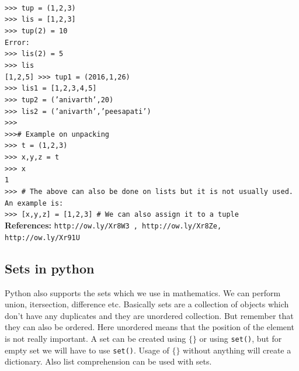 \documentclass[12pt,a4paper]{article}
\begin{document}
\texttt{\\
>>> tup = (1,2,3)\\
>>> lis = [1,2,3]\\
>>> tup(2) = 10\\
Error:\\
>>> lis(2) = 5\\
>>> lis\\
{[1,2,5]}
>>> tup1 = (2016,1,26)\\
>>> lis1 = [1,2,3,4,5]\\
>>> tup2 = ('anivarth',20)\\
>>> lis2 = ('anivarth','peesapati')\\
>>>\\
>>>\# Example on unpacking\\
>>> t = (1,2,3)\\
>>> x,y,z = t\\
>>> x\\
1\\
>>> \# The above can also be done on lists but it is not usually used. An example is:\\
>>> [x,y,z] = [1,2,3] \# We can also assign it to a tuple
}\\
\textbf{References:} \texttt{http://ow.ly/Xr8W3 , http://ow.ly/Xr8Ze, http://ow.ly/Xr91U}\\

\subsection{Sets in python}
Python also supports the sets which we use in mathematics. We can perform union, itersection, difference etc. Basically sets are a collection of objects which don't have any duplicates and they are unordered collection. But remember that they can also be ordered. Here unordered means that the position of the element is not really important.
A set can be created using \texttt{$\lbrace\rbrace$} or using \texttt{set()}, but for empty set we will have to use \texttt{set()}. Usage of \texttt{$\lbrace\rbrace$} without anything will create a dictionary. Also list comprehension can be used with sets.
\end{document}
